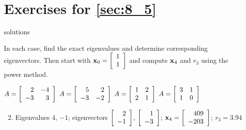 \section*{Exercises for \ref{sec:8_5}}

\begin{Filesave}{solutions}
\end{Filesave}

\begin{multicols}{2}
\begin{ex}
In each case, find the exact eigenvalues and determine corresponding eigenvectors. Then start with $\textbf{x}_{0} = \left[ \begin{array}{rr}
1  \\
1
\end{array}\right]$ and compute $\textbf{x}_{4}$ and $r_{3}$ using the power method.


\begin{exenumerate}
\exitem $A = \left[ \begin{array}{rr}
2 & -4 \\
-3 & 3
\end{array}\right]$
\exitem $A = \left[ \begin{array}{rr}
5 & 2 \\
-3 & -2
\end{array}\right]$
\exitem $A = \left[ \begin{array}{rr}
1 & 2 \\
2 & 1
\end{array}\right]$
\exitem $A = \left[ \begin{array}{rr}
3 & 1 \\
1 & 0
\end{array}\right]$
\end{exenumerate}
\begin{sol}
\begin{enumerate}[label={\alph*.}]
\setcounter{enumi}{1}
\item Eigenvalues $4$, $-1$; eigenvectors 
$\left[ \begin{array}{rr}
2  \\
-1
\end{array}\right]$,
$\left[ \begin{array}{rr}
1 \\
-3
\end{array}\right]$;
$\textbf{x}_{4} = \left[ \begin{array}{rr}
409  \\
-203
\end{array}\right]$;
$r_{3} = 3.94$


\end{enumerate}
\end{sol}
\end{ex}
\end{multicols}
